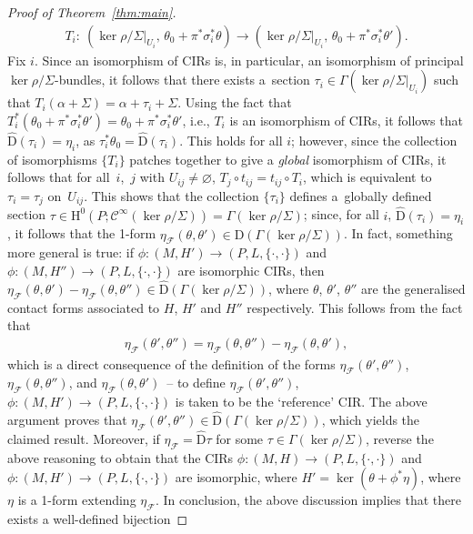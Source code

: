 \documentclass[10pt,a4paper]{amsart}
\numberwithin{equation}{section}
\newcommand{\JM}{(P,L,\{\cdot,\cdot\})} %
\newcommand{\CM}{(M,H)} %
\newcommand{\HH}{\mathrm{H}}
\begin{document}
\begin{proof}[Proof of Theorem~\ref{thm:main}]
 \begin{gather*}
 T_i \colon \ (\ker \rho/\Sigma|_{U_i},\, \theta_0 + \pi^* \sigma^*_i \theta ) \to (\ker \rho/\Sigma|_{U_i}, \, \theta_0 + \pi^* \sigma^*_i
 \theta' ).
 \end{gather*}
Fix $i$. Since an isomorphism of CIRs is, in particular, an isomorphism of principal $\ker \rho/\Sigma$-bundles, it follows that there exists a~section $\tau_i \in \Gamma (\ker \rho/\Sigma|_{U_i} )$ such that $T_i(\alpha + \Sigma) = \alpha + \tau_i +\Sigma$. Using the fact that $T_i^* (\theta_0 +\pi^*\sigma^*_i \theta' ) =\theta_0 +\pi^*\sigma^*_i \theta'$, i.e., $T_i$ is an isomorphism of CIRs, it follows that $\hat{\mathrm{D}}(\tau_i) = \eta_i$, as $\tau_i^* \theta_0 = \hat{\mathrm{D}}(\tau_i)$. This holds for all $i$; however, since the collection of isomorphisms $\{T_i\}$ patches together to give a {\em global} isomorphism of CIRs, it follows that for all~$i$,~$j$ with $U_{ij} \neq \varnothing$, $T_j \circ t_{ij} = t_{ij} \circ T_i$, which is equivalent to $\tau_i = \tau_j$ on~$U_{ij}$. This shows that the collection $\{\tau_i\}$ def\/ines a~globally def\/ined section $\tau \in \HH^0(P;\mathcal{C}^{\infty}(\ker \rho/\Sigma)) = \Gamma(\ker \rho/\Sigma)$; since, for all $i$, $\hat{\mathrm{D}}(\tau_i) = \eta_i$, it follows that the 1-form $\eta_{\mathcal{F}}(\theta,\theta') \in \hat{\mathrm{D}} (\Gamma (\ker \rho/\Sigma))$. In fact, something more general is true: if $\phi \colon (M,H') \to \JM$ and $\phi \colon (M,H'') \to \JM$ are isomorphic CIRs, then $\eta_{\mathcal{F}}(\theta,\theta') - \eta_{\mathcal{F}}(\theta,\theta'') \in \hat{\mathrm{D}}(\Gamma(\ker \rho/\Sigma))$, where $\theta$, $\theta'$, $\theta''$ are the generalised contact forms associated to $H$, $H'$ and $H''$ respectively. This follows from the fact that
 \begin{gather*}
 \eta_{\mathcal{F}}(\theta',\theta'') = \eta_{\mathcal{F}}(\theta,\theta'') - \eta_{\mathcal{F}}(\theta,\theta'),
 \end{gather*}
which is a direct consequence of the def\/inition of the forms $\eta_{\mathcal{F}}(\theta',\theta'')$, $\eta_{\mathcal{F}}(\theta,\theta'')$, and $ \eta_{\mathcal{F}}(\theta, \theta')$~-- to def\/ine $\eta_{\mathcal{F}}(\theta',\theta'')$, $\phi \colon (M,H') \to \JM$ is taken to be the `reference' CIR. The above argument proves that $\eta_{\mathcal{F}}(\theta',\theta'') \in \hat{\mathrm{D}}(\Gamma(\ker \rho/\Sigma))$, which yields the claimed result. Moreover, if $\eta_{\mathcal{F}} = \hat{\mathrm{D}}\tau$ for some $\tau \in \Gamma(\ker \rho/\Sigma)$, reverse the above reasoning to obtain that the CIRs $\phi \colon \CM \to \JM$ and $\phi \colon (M,H') \to \JM$ are isomorphic, where $H' = \ker (\theta + \phi^*\eta)$, where $\eta$ is a 1-form extending $\eta_{\mathcal{F}}$. In conclusion, the above discussion implies that there exists a well-def\/ined bijection

\end{proof}
\end{document}
